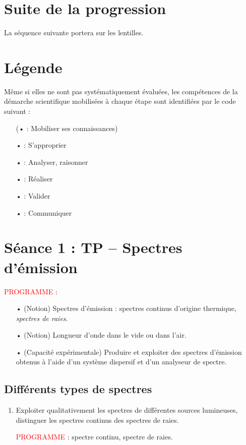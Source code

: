 \documentclass[12pt,a4paper,fleqn]{article}
\newcommand{\prog}{\textcolor{red}{PROGRAMME}}
\begin{document}
\section*{Suite de la progression}

La séquence suivante portera sur les lentilles.

\section*{Légende}

Même si elles ne sont pas systématiquement évaluées, les compétences de la démarche scientifique mobilisées à chaque étape sont identifiées par le code suivant :
\begin{itemize}
\item[(•] \rco{} : Mobiliser ses connaissances)
\item[•] \app{} : S'approprier
\item[•] \anarai{} : Analyser, raisonner
\item[•] \rea{} : Réaliser
\item[•] \val{} : Valider
\item[•] \com{} : Communiquer
\end{itemize} 





\newpage
\section*{Séance 1 : TP -- Spectres d'émission}

\noindent
\prog{} :
\begin{itemize}
\item[•] (Notion) Spectres d'émission : spectres continus d'origine thermique, \textit{spectres de raies}.
\item[•] (Notion) Longueur d'onde dans le vide ou dans l'air.
\item[•] (Capacité expérimentale) Produire et exploiter des spectres d'émission obtenus à l'aide d'un système dispersif et d'un analyseur de spectre.
\end{itemize}

\subsection*{Différents types de spectres}

\begin{enumerate}
\item \app{} \anarai{}

Exploiter qualitativement les spectres de différentes sources lumineuses, distinguer les spectres continus des spectres de raies.

\prog{} : spectre continu, spectre de raies.

\end{enumerate}
\end{document}
